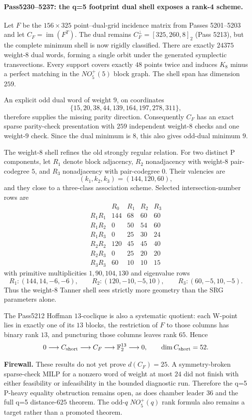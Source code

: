 \paragraph{Pass5230--5237: the q=5 footprint dual shell exposes a rank-4 scheme.}
Let $F$ be the $156\times325$ point--dual-grid incidence matrix from Passes 5201--5203 and let $C_F=\operatorname{im}(F^T)$.  The dual remains $C_F^\perp=[325,260,8]_2$ (Pass 5213), but the complete minimum shell is now rigidly classified.  There are exactly $24375$ weight-$8$ dual words, forming a single orbit under the generated symplectic transvections.  Every support covers exactly $48$ points twice and induces $K_8$ minus a perfect matching in the $NO_5^+(5)$ block graph.  The shell span has dimension $259$.

An explicit odd dual word of weight $9$, on coordinates
\[
\{15,20,38,44,139,164,197,278,311\},
\]
therefore supplies the missing parity direction.  Consequently $C_F$ has an exact sparse parity-check presentation with $259$ independent weight-$8$ checks and one weight-$9$ check.  Since the dual minimum is $8$, this also gives odd-dual minimum $9$.

The weight-$8$ shell refines the old strongly regular relation.  For two distinct P components, let $R_1$ denote block adjacency, $R_2$ nonadjacency with weight-$8$ pair-codegree $5$, and $R_3$ nonadjacency with pair-codegree $0$.  Their valencies are
\[
(k_1,k_2,k_3)=(144,120,60),
\]
and they close to a three-class association scheme.  Selected intersection-number rows are
\[
\begin{array}{c|cccc}
 &R_0&R_1&R_2&R_3\\\hline
R_1R_1&144&68&60&60\\
R_1R_2&0&50&54&60\\
R_1R_3&0&25&30&24\\
R_2R_2&120&45&45&40\\
R_2R_3&0&25&20&20\\
R_3R_3&60&10&10&15
\end{array}
\]
with primitive multiplicities $1,90,104,130$ and eigenvalue rows
\[
R_1:(144,14,-6,-6),\qquad
R_2:(120,-10,-5,10),\qquad
R_3:(60,-5,10,-5).
\]
Thus the weight-$8$ Tanner shell sees strictly more geometry than the SRG parameters alone.

The Pass5212 Hoffman $13$-coclique is also a systematic quotient: each W-point lies in exactly one of its $13$ blocks, the restriction of $F$ to those columns has binary rank $13$, and puncturing those columns leaves rank $65$.  Hence
\[
0\longrightarrow C_{\rm short}\longrightarrow C_F\longrightarrow\mathbb F_2^{13}\longrightarrow0,
\qquad \dim C_{\rm short}=52.
\]

\textbf{Firewall.}  These results do not yet prove $d(C_F)=25$.  A symmetry-broken sparse-check MILP for a nonzero word of weight at most $24$ did not finish with either feasibility or infeasibility in the bounded diagnostic run.  Therefore the q=5 P-heavy equality obstruction remains open, as does chamber leader $36$ and the full q=5 distance-$625$ theorem.  The odd-$q$ $NO_5^+(q)$ rank formula also remains a target rather than a promoted theorem.
